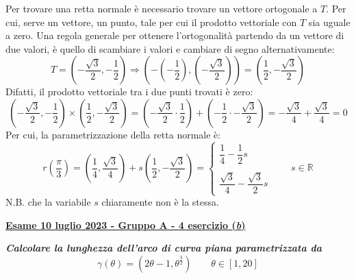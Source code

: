 \documentclass[a4paper]{article}
\newcommand{\definition}[1]{\textcolor{Red3}{\textbf{#1}}}
\newcommand{\example}[1]{\textcolor{Green4}{\textbf{#1}}}
\begin{document}
	Per trovare una retta normale è necessario trovare un vettore ortogonale a $T$. Per cui, serve un vettore, un punto, tale per cui il prodotto vettoriale con $T$ sia uguale a zero. Una regola generale per ottenere l'ortogonalità partendo da un vettore di due valori, è quello di scambiare i valori e cambiare di segno alternativamente:
	\begin{equation*}
		T = \left(-\frac{\sqrt{3}}{2}, -\frac{1}{2}\right) \Rightarrow \left(-\left(-\frac{1}{2}\right), \left(-\frac{\sqrt{3}}{2}\right)\right) = \left(\frac{1}{2}, -\frac{\sqrt{3}}{2}\right)
	\end{equation*}
	Difatti, il prodotto vettoriale tra i due punti trovati è zero:
	\begin{equation*}
		\left(-\frac{\sqrt{3}}{2}, -\frac{1}{2}\right) \times \left(\frac{1}{2}, -\frac{\sqrt{3}}{2}\right) = \left(-\frac{\sqrt{3}}{2} \cdot \frac{1}{2}\right) + \left(-\frac{1}{2} \cdot -\frac{\sqrt{3}}{2}\right) = -\frac{\sqrt{3}}{4} + \frac{\sqrt{3}}{4} = 0
	\end{equation*}
	Per cui, la parametrizzazione della retta normale è:
	\begin{equation*}
		r\left(\frac{\pi}{3}\right)
		=
		\left(\frac{1}{4}, \frac{\sqrt{3}}{4}\right) + s \left(\frac{1}{2}, -\frac{\sqrt{3}}{2}\right)
		=
		\begin{cases}
			\dfrac{1}{4} - \dfrac{1}{2}s \\ \\
			\dfrac{\sqrt{3}}{4} - \dfrac{\sqrt{3}}{2}s
		\end{cases}
		\hspace{2em}
		s \in \mathbb{R}
	\end{equation*}
	N.B. che la variabile $s$ chiaramente non è la stessa.\newpage

	\begin{flushleft}
		\label{exam: esame 10 luglio 2023 - Gruppo A - 4 esercizio (b)}
		\hypertarget{
			exam: esame 10 luglio 2023 - Gruppo A - 4 esercizio (b)
		}{
			\definition{\underline{Esame 10 luglio 2023 - Gruppo A - 4 esercizio (\emph{b})}}
		}
	\end{flushleft}
	\example{\emph{Calcolare la lunghezza dell'arco di curva piana parametrizzata da}
	\begin{equation*}
		\gamma\left(\theta\right) = \left(2\theta - 1, \theta^{\frac{3}{2}}\right) \hspace{2em} \theta \in \left[1, 20\right]
	\end{equation*}}
\end{document}
